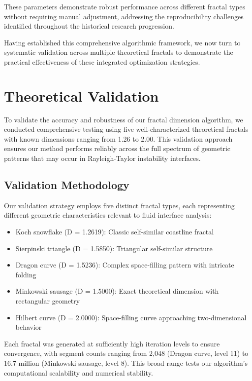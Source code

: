 \documentclass[preprint,12pt]{elsarticle}
\def\textbf#1{#1}%
\begin{document}
These parameters demonstrate robust performance across different fractal types without requiring manual adjustment, addressing the reproducibility challenges identified throughout the historical research progression.

Having established this comprehensive algorithmic framework, we now turn to systematic validation across multiple theoretical fractals to demonstrate the practical effectiveness of these integrated optimization strategies.

\section{Theoretical Validation}

To validate the accuracy and robustness of our fractal dimension algorithm, we conducted comprehensive testing using five well-characterized theoretical fractals with known dimensions ranging from 1.26 to 2.00. This validation approach ensures our method performs reliably across the full spectrum of geometric patterns that may occur in Rayleigh-Taylor instability interfaces.

\subsection{Validation Methodology}

Our validation strategy employs five distinct fractal types, each representing different geometric characteristics relevant to fluid interface analysis:

\begin{itemize}
\item \textbf{Koch snowflake} (D = 1.2619): Classic self-similar coastline fractal
\item \textbf{Sierpinski triangle} (D = 1.5850): Triangular self-similar structure
\item \textbf{Dragon curve} (D = 1.5236): Complex space-filling pattern with intricate folding
\item \textbf{Minkowski sausage} (D = 1.5000): Exact theoretical dimension with rectangular geometry
\item \textbf{Hilbert curve} (D = 2.0000): Space-filling curve approaching two-dimensional behavior
\end{itemize}

Each fractal was generated at sufficiently high iteration levels to ensure convergence, with segment counts ranging from 2,048 (Dragon curve, level 11) to 16.7 million (Minkowski sausage, level 8). This broad range tests our algorithm's computational scalability and numerical stability.
\end{document}
